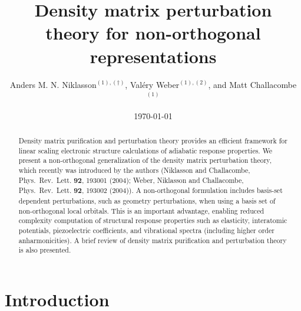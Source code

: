 \documentclass[twocolumn,showpacs,preprintnumbers,amsmath,amssymb]{revtex4}
\begin{document}

\title{Density matrix perturbation theory for non-orthogonal representations}

\author{Anders M. N. Niklasson$^{(1),(\dagger)}$, Val\'ery Weber$^{(1),(2)}$, and Matt Challacombe$^{(1)}$}


\date{\today}

\begin{abstract}
Density matrix purification and perturbation theory provides an efficient
framework for linear scaling electronic structure calculations of adiabatic response properties. 
We present a non-orthogonal generalization of the density matrix perturbation theory, which 
recently was introduced by the authors (Niklasson and Challacombe, Phys.\ Rev.\ Lett.  
{\bf 92}, 193001 (2004); Weber, Niklasson and Challacombe, Phys.\ Rev.\ Lett.  
{\bf 92}, 193002 (2004)).  A non-orthogonal formulation includes basis-set 
dependent perturbations, such as geometry perturbations, when using a basis 
set of non-orthogonal local orbitals.  This is an important advantage, 
enabling reduced complexity computation of structural response properties 
such as elasticity, interatomic potentials, piezoelectric coefficients, and vibrational 
spectra (including higher order anharmonicities). A brief review of density matrix
purification and perturbation theory is also presented.
\end{abstract}

\maketitle

\section{Introduction}
\end{document}
